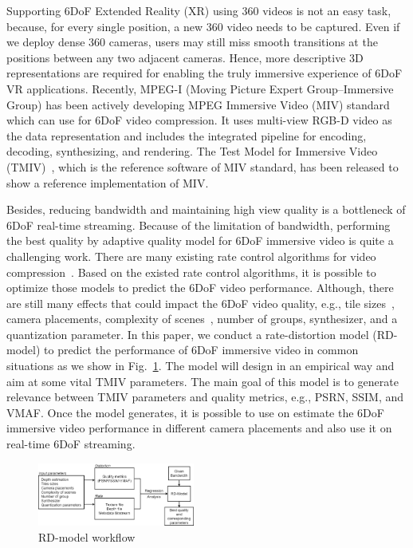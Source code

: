 Supporting 6DoF Extended Reality (XR) using 360{\degree} videos is not an easy task, because, for every single position, a new 360{\degree} video needs to be captured.
Even if we deploy dense 360{\degree} cameras, users may still miss smooth transitions at the positions between any two adjacent cameras.
Hence, more descriptive 3D representations are required for enabling the truly immersive experience of 6DoF VR applications.
Recently, MPEG-I (Moving Picture Expert Group--Immersive Group) has been actively developing MPEG Immersive Video (MIV) standard~\cite{BDDF+21, MPEG_MIV_web} which can use for 6DoF video compression.
It uses multi-view RGB-D video as the data representation and includes the integrated pipeline for encoding, decoding, synthesizing, and rendering.
The Test Model for Immersive Video (TMIV)~\cite{tmiv_doc,tmiv_gitlab}, which is the reference software of MIV standard, has been released to show a reference implementation of MIV.

Besides, reducing bandwidth and maintaining high view quality is a bottleneck of 6DoF real-time streaming.
Because of the limitation of bandwidth, performing the best quality by adaptive quality model for 6DoF immersive video is quite a challenging work.
There are many existing rate control algorithms for video compression~\cite{PZAB16}\cite{WYTC12}\cite{ZM01}.
Based on the existed rate control algorithms, it is possible to optimize those models to predict the 6DoF video performance.
Although, there are still many effects that could impact the 6DoF video quality, e.g., tile sizes~\cite{JLRL+20}, camera placements, complexity of scenes~\cite{SCB21}, number of groups, synthesizer, and a quantization parameter.
In this paper, we conduct a rate-distortion model (RD-model) to predict the performance of 6DoF immersive video in common situations as we show in Fig.~\ref{fig:RD_model_concept}.
The model will design in an empirical way and aim at some vital TMIV parameters.
The main goal of this model is to generate relevance between TMIV parameters and quality metrics, e.g., PSRN, SSIM, and VMAF.
Once the model generates, it is possible to use on estimate the 6DoF immersive video performance in different camera placements and also use it on real-time 6DoF streaming.

\begin{figure}[tbh]
    \centering
    \includegraphics[width=0.46\textwidth]{figs/RD_model_concept}
    \caption{RD-model workflow}
    \label{fig:RD_model_concept}
\end{figure}


